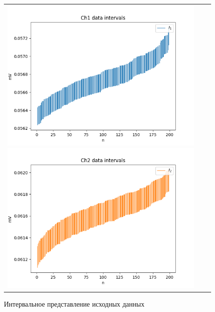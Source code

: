 \documentclass[../main.tex]{subfiles}
\begin{document}
\begin{figure}[H]
	\begin{tabular}{ccc}
		\includegraphics[scale=0.5]{figures/intervals_PR1.png}
		\includegraphics[scale=0.5]{figures/intervals_PR2.png}
	\end{tabular}
	\caption{Интервальное представление исходных данных} 
\end{figure}
\end{document}
